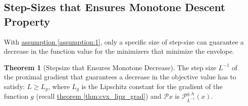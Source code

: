\documentclass[]{article}
\theoremstyle{definition}
\newtheorem{theorem}{Theorem}       %
\begin{document}
    \subsection{Step-Sizes that Ensures Monotone Descent Property}
        With \hyperref[assumption:1]{assumption \ref*{assumption:1}}, only a specific size of step-size can guarantee a decrease in the function value for the minimizers that minimize the envelope. 
        \begin{theorem}[Stepsize that Ensures Monotone Decrease]\label{thm:monotone_decrease}
            The step size $L^{-1}$ of the proximal gradient that guarantees a decrease in the objective value has to satisfy: $L \ge L_g$, where $L_g$ is the Lipschitz constant for the gradient of the function $g$ (recall \hyperref[thm:cvx_lipz_grad]{theorem \ref*{thm:cvx_lipz_grad}}) and $\mathcal Px$ is $\mathcal P_{L^{-1}}^{g, h}(x)$. 
        \end{theorem}
\end{document}
